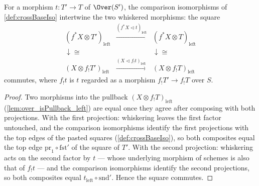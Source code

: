 \begin{theorem}
  \label{thm:crossBaseIso_naturality}
  \leanok
  For a morphism \(t : T' \to T\) of \(\Over(S')\), the comparison isomorphisms of
  \ref{def:crossBaseIso} intertwine the two whiskered morphisms: the square
  \[
    \begin{array}{ccc}
      (f^{*}X \otimes T')_{\mathrm{left}} &
        \xrightarrow{(f^{*}X \lhd t)_{\mathrm{left}}} &
        (f^{*}X \otimes T)_{\mathrm{left}} \\
      \downarrow \cong & & \downarrow \cong \\
      (X \otimes f_{!}T')_{\mathrm{left}} &
        \xrightarrow{(X \lhd f_{!}t)_{\mathrm{left}}} &
        (X \otimes f_{!}T)_{\mathrm{left}}
    \end{array}
  \]
  commutes, where \(f_{!}t\) is \(t\) regarded as a morphism \(f_{!}T' \to f_{!}T\)
  over \(S\).
\end{theorem}
\begin{proof}
  \leanok
  Two morphisms into the pullback \((X \otimes f_{!}T)_{\mathrm{left}}\)
  (\ref{lem:over_isPullback_left}) are equal once they agree after composing with both
  projections. With the first projection: whiskering leaves the first factor untouched,
  and the comparison isomorphisms identify the first projections with the top edges of
  the pasted squares (\ref{def:crossBaseIso}), so both composites equal the top edge
  \(\mathrm{pr}_1 \circ \mathrm{fst}'\) of the square of \(T'\). With the second
  projection: whiskering acts on the second factor by \(t\) --- whose underlying
  morphism of schemes is also that of \(f_{!}t\) --- and the comparison isomorphisms
  identify the second projections, so both composites equal
  \(t_{\mathrm{left}} \circ \mathrm{snd}'\). Hence the square commutes.
\end{proof}

